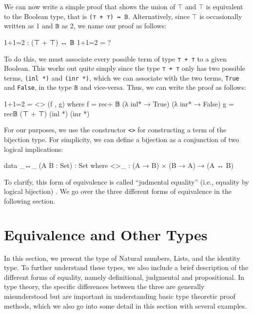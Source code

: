 \documentclass[12pt]{article}
\begin{document}
We can now write a simple proof that shows the union of \(\top\) and \(\top\)
is equivalent to the Boolean type, that is {\tt (⊤ + ⊤) ↔ 𝔹}.
Alternatively, since \(\top\) is occasionally written as 1 and {\tt 𝔹} as 2, we
name our proof as follows:
\begin{center}
\begin{minipage}{0.9\textwidth}
\begin{code}
1+1=2 : (⊤ + ⊤) ↔ 𝔹
1+1=2 = ?
\end{code}
\end{minipage}
\end{center}
To do this, we must associate every possible term of type {\tt ⊤ + ⊤} to a
given Boolean. This works out quite simply since the type {\tt ⊤ + ⊤} only has
two possible terms, {\tt (inl *)} and {\tt (inr *)}, which we can associate with
the two terms, {\tt True} and {\tt False}, in the type {\tt 𝔹} and vice-versa.
Thus, we can write the proof as follows:
\begin{center}
\begin{minipage}{0.9\textwidth}
\begin{code}
1+1=2 = <> (f , g)
  where f = rec+ 𝔹 (λ inl* → True) (λ inr* → False)
        g = rec𝔹 (⊤ + ⊤) (inl *) (inr *)
\end{code}
\end{minipage}
\end{center}
For our purposes, we use the constructor {\tt <>} for constructing a term of
the bijection type. For simplicity, we can define a bijection as a conjunction
of two logical implications:
\begin{center}
\begin{minipage}{0.9\textwidth}
\begin{code}
data _↔_ (A B : Set) : Set where
  <>_ : (A → B) × (B → A) → (A ↔ B)
\end{code}
\end{minipage}
\end{center}
To clarify, this form of equivalence is called ``judmental equality'' (i.e.,
equality by logical bijection) \cite{}. We go over the three different forms of
equivalence in the following section.

\section{Equivalence and Other Types}
In this section, we present the type of Natural numbers, Lists, and the identity
type. To further understand these types, we also include a brief description of
the different forms of equality, namely definitional, judgmental and
propositional. In type theory, the specific differences between the three are
generally misunderstood but are important in understanding basic type theoretic
proof methods, which we also go into some detail in this section with several
examples.
\end{document}
